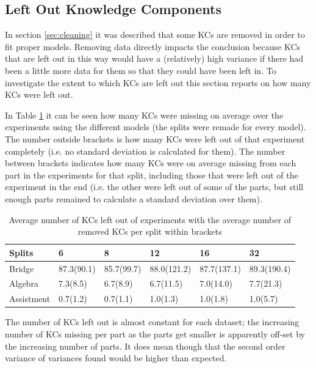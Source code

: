 \documentclass{scrartcl}
\begin{document}
\subsection{Left Out Knowledge Components}
In section \ref{sec:cleaning} it was described that some KCs are removed in order to fit proper models. Removing data directly impacts the conclusion because KCs that are left out in this way would have a (relatively) high variance if there had been a little more data for them so that they could have been left in. To investigate the extent to which KCs are left out this section reports on how many KCs were left out.   

In Table \ref{tab:kcmis} it can be seen how many KCs were missing on average over the experiments using the different models (the splits were remade for every model). The number outside brackets is how many KCs were left out of that experiment completely (i.e. no standard deviation is calculated for them). The number between brackets indicates how many KCs were on average missing from each part in the experiments for that split, including those that were left out of the experiment in the end (i.e. the other were left out of some of the parts, but still enough parts remained to calculate a standard deviation over them). 


\begin{table}[h]
\centering
\begin{tabular}{| l | l|l|l|l|l|}

    \hline
    Splits & 6  & 8 & 12 & 16 & 32 \\ \hline
    Bridge &  87.3(90.1)& 85.7(99.7)& 88.0(121.2)& 87.7(137.1)& 89.3(190.4) \\ \hline
    Algebra & 7.3(8.5)& 6.7(8.9)& 6.7(11.5)& 7.0(14.0)& 7.7(21.3) \\ \hline
    Assistment & 0.7(1.2)& 0.7(1.1)& 1.0(1.3)& 1.0(1.8)& 1.0(5.7) \\ \hline

\end{tabular}
\caption{Average number of KCs left out of experiments with the average number of removed KCs per split within brackets}
\label{tab:kcmis}
\end{table}


The number of KCs left out is almost constant for each dataset; the increasing number of KCs missing per part as the parts get smaller is apparently off-set by the increasing number of parts. It does mean though that the second order variance of variances found would be higher than expected.
\end{document}
